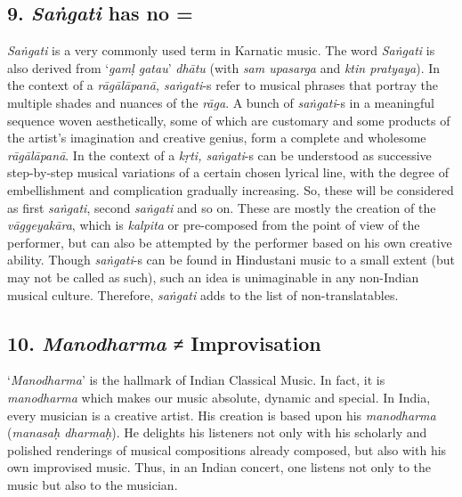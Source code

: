 \subsection*{9. \textit{Saṅgati} has no =}

\textit{Saṅgati} is a very commonly used term in Karnatic music. The word \textit{Saṅgati} is also derived from ‘\textit{gamḷ gatau}’ \textit{dhātu} (with \textit{sam upasarga} and \textit{ktin pratyaya}). In the context of a \textit{rāgālāpanā, saṅgati}-s refer to musical phrases that portray the multiple shades and nuances of the \textit{rāga}. A bunch of \textit{saṅgati}-s in a meaningful sequence woven aesthetically, some of which are customary and some products of the artist’s imagination and creative genius, form a complete and wholesome \textit{rāgālāpanā}. In the context of a \textit{kṛti, saṅgati}-s can be understood as successive step-by-step musical variations of a certain chosen lyrical line, with the degree of embellishment and complication gradually increasing. So, these will be considered as first \textit{saṅgati}, second \textit{saṅgati} and so on. These are mostly the creation of the \textit{vāggeyakāra}, which is \textit{kalpita} or pre-composed from the point of view of the performer, but can also be attempted by the performer based on his own creative ability. Though \textit{saṅgati}-s can be found in Hindustani music to a small extent (but may not be called as such), such an idea is unimaginable in any non-Indian musical culture. Therefore, \textit{saṅgati} adds to the list of non-translatables.


\subsection*{10. \textit{Manodharma} ≠ Improvisation}

‘\textit{Manodharma}’ is the hallmark of Indian Classical Music. In fact, it is \textit{manodharma} which makes our music absolute, dynamic and special. In India, every musician is a creative artist. His creation is based upon his \textit{manodharma} (\textit{manasaḥ dharmaḥ}). He delights his listeners not only with his scholarly and polished renderings of musical compositions already composed, but also with his own improvised music. Thus, in an Indian concert, one listens not only to the music but also to the musician.


